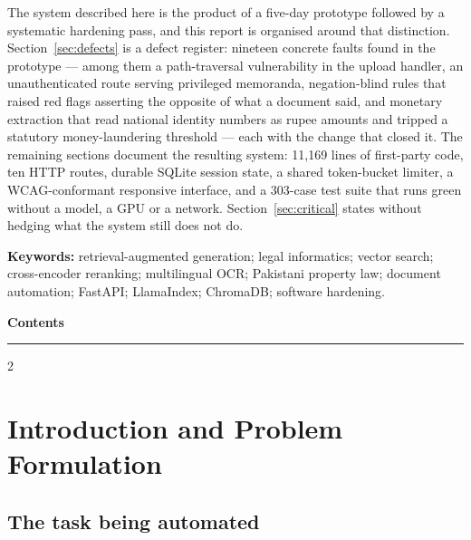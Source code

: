 \documentclass[11pt,a4paper]{article}
\begin{document}
The system described here is the product of a five-day prototype followed by a
systematic hardening pass, and this report is organised around that distinction.
Section~\ref{sec:defects} is a defect register: nineteen concrete faults found in the
prototype --- among them a path-traversal vulnerability in the upload handler, an
unauthenticated route serving privileged memoranda, negation-blind rules that raised red
flags asserting the opposite of what a document said, and monetary extraction that read
national identity numbers as rupee amounts and tripped a statutory money-laundering
threshold --- each with the change that closed it. The remaining sections document the
resulting system: 11{,}169 lines of first-party code, ten HTTP routes, durable SQLite
session state, a shared token-bucket limiter, a WCAG-conformant responsive interface, and
a 303-case test suite that runs green without a model, a GPU or a network.
Section~\ref{sec:critical} states without hedging what the system still does not do.

\vspace{2pt}
\begin{quietbox}
\footnotesize
\textbf{Keywords:} retrieval-augmented generation; legal informatics; vector search;
cross-encoder reranking; multilingual OCR; Pakistani property law; document automation;
FastAPI; LlamaIndex; ChromaDB; software hardening.
\end{quietbox}

\vspace{6pt}
{\color{navy}\large\bfseries Contents}\vspace{-6pt}\\
{\color{gold}\rule{\linewidth}{1.1pt}}
\vspace{-20pt}
{\footnotesize\setlength{\parskip}{0pt}\renewcommand{\contentsname}{}
 \setcounter{tocdepth}{1}
 \begin{multicols}{2}\tableofcontents\end{multicols}}

\newpage

\section{Introduction and Problem Formulation}

\subsection{The task being automated}
\end{document}
